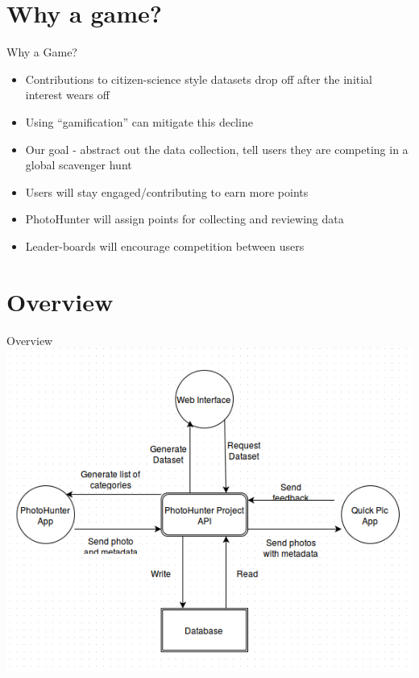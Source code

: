 \documentclass[aspectratio=169]{beamer}
\begin{document}
\section{Why a game?}

\begin{frame}{Why a Game?}
  \begin{itemize}

    \item Contributions to citizen-science style datasets drop off after
          the initial interest wears off

    \item Using ``gamification'' can mitigate this decline

    \item Our goal - abstract out the data collection, tell users they
          are competing in a global scavenger hunt

    \item Users will stay engaged/contributing to earn more points

    \item PhotoHunter will assign points for collecting and reviewing data

    \item Leader-boards will encourage competition between users

  \end{itemize}
\end{frame}

\section{Overview}

\begin{frame}{Overview}
  \centering
  \includegraphics[width=\textwidth,height=\textheight,keepaspectratio]{ss_flowchart}
\end{frame}
\end{document}
